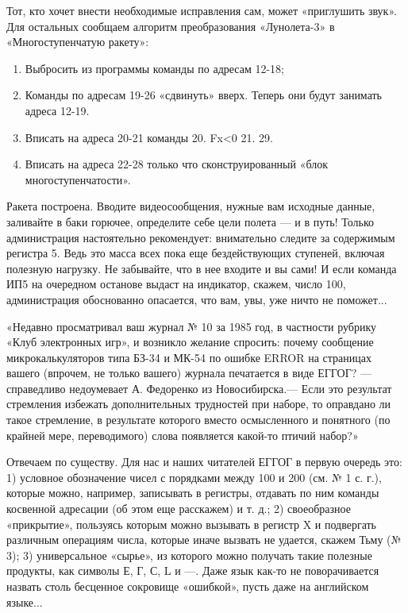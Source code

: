\documentclass[11pt,a4paper,oneside]{article}
\begin{document}
Тот, кто хочет внести необходимые исправления сам, может «приглушить звук». Для остальных сообщаем алгоритм преобразования «Лунолета-3» в «Многоступенчатую ракету»:

\begin{enumerate}
\item Выбросить из программы команды по адресам 12-18;
\item Команды по адресам 19-26 «сдвинуть» вверх. Теперь они будут занимать адреса 12-19.
\item Вписать на адреса 20-21 команды 20. Fx<0 21. 29.
\item Вписать на адреса 22-28 только что сконструированный «блок многоступенчатости».
\end{enumerate}

Ракета построена. Вводите видеосообщения, нужные вам исходные данные, заливайте в баки горючее, определите себе цели полета — и в путь! Только администрация настоятельно рекомендует: внимательно следите за содержимым регистра 5. Ведь это масса всех пока еще бездействующих ступеней, включая полезную нагрузку. Не забывайте, что в нее входите и вы сами! И если команда ИП5 на очередном останове выдаст на индикатор, скажем, число 100, администрация обоснованно опасается, что вам, увы, уже ничто не поможет...

«Недавно просматривал ваш журнал № 10 за 1985 год, в частности рубрику «Клуб электронных игр», и возникло желание спросить: почему сообщение микрокалькуляторов типа БЗ-34 и МК-54 по ошибке ERROR на страницах вашего (впрочем, не только вашего) журнала печатается в виде ЕГГОГ? — справедливо недоумевает А. Федоренко из Новосибирска.— Если это результат стремления избежать дополнительных трудностей при наборе, то оправдано ли такое стремление, в результате которого вместо осмысленного и понятного (по крайней мере, переводимого) слова появляется какой-то птичий набор?»

Отвечаем по существу. Для нас и наших читателей ЕГГОГ в первую очередь это: 1) условное обозначение чисел с порядками между 100 и 200 (см. № 1 с. г.), которые можно, например, записывать в регистры, отдавать по ним команды косвенной адресации (об этом еще расскажем) и т. д.; 2) своеобразное «прикрытие», пользуясь которым можно вызывать в регистр X и подвергать различным операциям числа, которые иначе вызвать не удается, скажем Тьму (№ 3); 3) универсальное «сырье», из которого можно получать такие полезные продукты, как символы Е, Г, С, L и —. Даже язык как-то не поворачивается назвать столь бесценное сокровище «ошибкой», пусть даже на английском языке...
\end{document}
